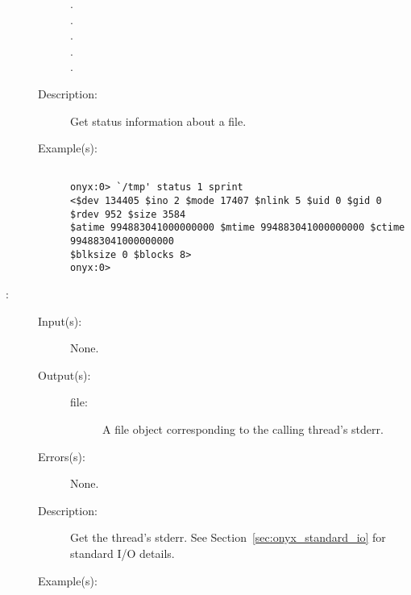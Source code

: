 \begin{description}
\begin{description}
\begin{description}
		\item[.]
		\item[.]
		\item[.]
		\item[.]
		\item[.]
		\end{description}
	\item[Description: ]
		Get status information about a file.
	\item[Example(s): ]\begin{verbatim}

onyx:0> `/tmp' status 1 sprint
<$dev 134405 $ino 2 $mode 17407 $nlink 5 $uid 0 $gid 0 $rdev 952 $size 3584
$atime 994883041000000000 $mtime 994883041000000000 $ctime 994883041000000000
$blksize 0 $blocks 8>
onyx:0>
		\end{verbatim}
	\end{description}
\label{systemdict:stderr}
\item[{\onyxop{--}{stderr}{file}}: ]
	\begin{description}\item[]
	\item[Input(s): ] None.
	\item[Output(s): ]
		\begin{description}\item[]
		\item[file: ]
			A file object corresponding to the calling thread's
			stderr.
		\end{description}
	\item[Errors(s): ] None.
	\item[Description: ]
		Get the thread's stderr.  See Section~\ref{sec:onyx_standard_io}
		for standard I/O details.
	\item[Example(s): ]\begin{verbatim}


\end{verbatim}
\end{description}
\end{description}

